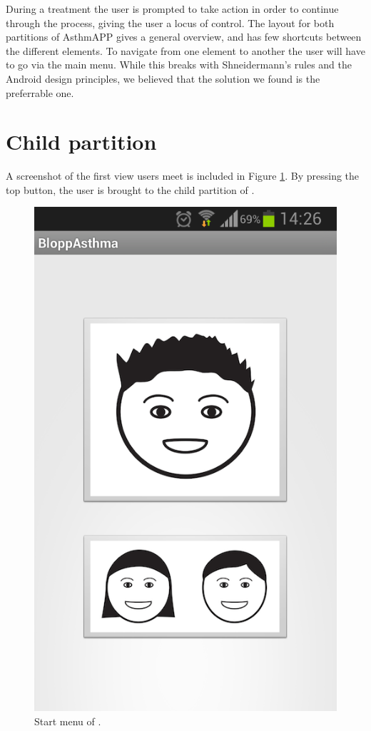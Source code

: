 During a treatment the user is prompted to take action in order to continue through the process, giving the user a locus of control. The layout for both partitions of AsthmAPP gives a general overview, and has few shortcuts between the different elements. To navigate from one element to another the user will have to go via the main menu. While this breaks with Shneidermann's rules and the Android design principles, we believed that the solution we found is the preferrable one.



\section{Child partition}
\label{sec:description-child-partition}

A screenshot of the first view users meet is included in Figure \ref{fig:asthmapp-main-menu}. By pressing the top button, the user is brought to the child partition of \app{}. 

\begin{figure}[H]
	\centering
	\includegraphics[width=0.25\paperwidth]{Pictures/app-screenshots/asthmapp-main-menu.png}
	\caption{Start menu of \app{}.}
	\label{fig:asthmapp-main-menu}
\end{figure}


